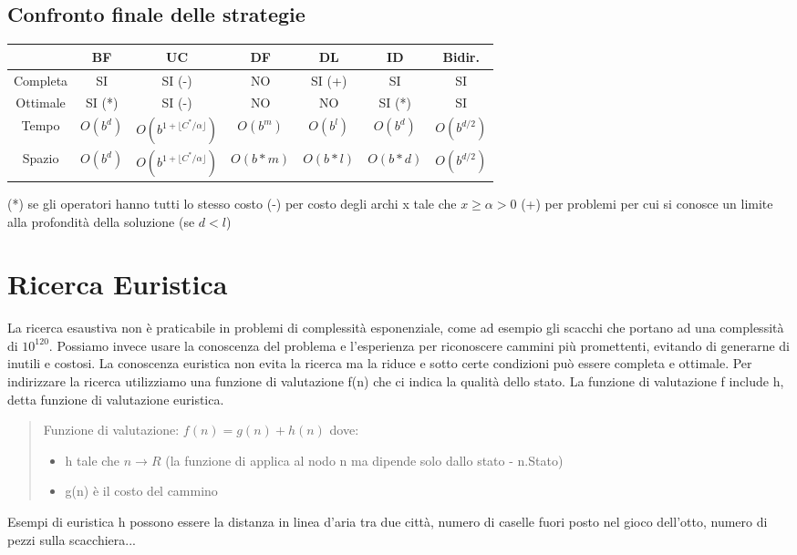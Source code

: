 \documentclass{article}
\begin{document}
\subsection{Confronto finale delle strategie}
\begin{table} [H]
    \centering
    \begin{tabular}{|c|c|c|c|c|c|c|}
        \hline
                    & BF        & UC                                        & DF        & DL        & ID        & Bidir. \\ \hline
        Completa    & SI        & SI (-)                                    & NO        & SI (+)    & SI        & SI \\ 
        Ottimale    & SI (*)    & SI (-)                                    & NO        & NO        & SI (*)    & SI \\ 
        Tempo       & $O(b^d)$  & $O(b^{1+ \lfloor C^*/\alpha \rfloor})$    & $O(b^m)$  & $O(b^l)$  & $O(b^d)$  & $O(b^{d/2})$\\ 
        Spazio      & $O(b^d)$  & $O(b^{1+ \lfloor C^*/\alpha \rfloor})$    & $O(b*m)$  & $O(b*l)$  & $O(b*d)$  & $O(b^{d/2})$ \\
        \hline
    \end{tabular}
\end{table}
(*) se gli operatori hanno tutti lo stesso costo \newline
(-) per costo degli archi x tale che $ x \geq \alpha > 0$ \newline
(+) per problemi per cui si conosce un limite alla profondità della soluzione (se $d<l$)

\section{Ricerca Euristica}
La ricerca esaustiva non è praticabile in problemi di complessità esponenziale, come ad esempio gli scacchi che portano ad una complessità di $10^{120}$. Possiamo invece usare la conoscenza del problema e l'esperienza per riconoscere cammini più promettenti, evitando di generarne di inutili e costosi. La conoscenza euristica non evita la ricerca ma la riduce e sotto certe condizioni può essere completa e ottimale. \newline 
Per indirizzare la ricerca utilizziamo una funzione di valutazione f(n) che ci indica la qualità dello stato. La funzione di valutazione f include h, detta funzione di valutazione euristica.
\begin{quote}
    Funzione di valutazione: $f(n) = g(n) + h(n)$ dove: 
    \begin{itemize}
        \item h tale che $n \rightarrow R$ (la funzione di applica al nodo n ma dipende solo dallo stato - n.Stato)
        \item g(n) è il costo del cammino
    \end{itemize}
\end{quote}
Esempi di euristica h possono essere la distanza in linea d'aria tra due città, numero di caselle fuori posto nel gioco dell'otto, numero di pezzi sulla scacchiera...
\end{document}
